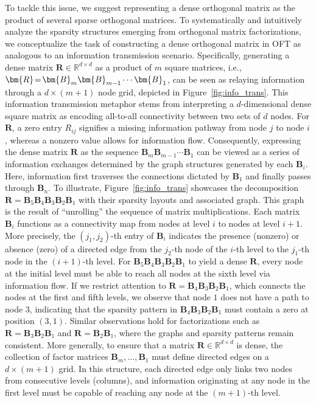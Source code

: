 To tackle this issue, we suggest representing a dense orthogonal matrix as the product of several sparse orthogonal matrices. To systematically and intuitively analyze the sparsity structures emerging from orthogonal matrix factorizations, we conceptualize the task of constructing a dense orthogonal matrix in OFT as analogous to an information transmission scenario. Specifically, generating a dense matrix $\bm{R}\in\mathbb{R}^{d\times d}$ as a product of $m$ square matrices, i.e., $\thickmuskip=2mu \medmuskip=2mu \bm{R}=\bm{B}_m\bm{B}_{m-1}\cdots\bm{B}_1$, can be seen as relaying information through a $d\times (m+1)$ node grid, depicted in Figure~\ref{fig:info_trans}. This information transmission metaphor stems from interpreting a $d$-dimensional dense square matrix as encoding all-to-all connectivity between two sets of $d$ nodes. For $\bm{R}$, a zero entry $R_{ij}$ signifies a missing information pathway from node $j$ to node $i$, whereas a nonzero value allows for information flow. Consequently, expressing the dense matrix $\bm{R}$ as the sequence $\bm{B}_m\bm{B}_{m-1}\cdots\bm{B}_1$ can be viewed as a series of information exchanges determined by the graph structures generated by each $\bm{B}_i$. Here, information first traverses the connections dictated by $\bm{B}_1$ and finally passes through $\bm{B}_n$. To illustrate, Figure~\ref{fig:info_trans} showcases the decomposition $\bm{R}=\bm{B}_5\bm{B}_4\bm{B}_3\bm{B}_2\bm{B}_1$ with their sparsity layouts and associated graph. This graph is the result of “unrolling” the sequence of matrix multiplications. Each matrix $\bm{B}_i$ functions as a connectivity map from nodes at level $i$ to nodes at level $i+1$. More precisely, the $(j_1, j_2)$-th entry of $\bm{B}_i$ indicates the presence (nonzero) or absence (zero) of a directed edge from the $j_2$-th node of the $i$-th level to the $j_1$-th node in the $(i+1)$-th level. For $\bm{B}_5\bm{B}_4\bm{B}_3\bm{B}_2\bm{B}_1$ to yield a dense $\bm{R}$, every node at the initial level must be able to reach all nodes at the sixth level via information flow. If we restrict attention to $\bm{R}=\bm{B}_4\bm{B}_3\bm{B}_2\bm{B}_1$, which connects the nodes at the first and fifth levels, we observe that node $1$ does not have a path to node $3$, indicating that the sparsity pattern in $\bm{B}_4\bm{B}_3\bm{B}_2\bm{B}_1$ must contain a zero at position $(3,1)$. Similar observations hold for factorizations such as $\bm{R}=\bm{B}_3\bm{B}_2\bm{B}_1$ and $\bm{R}=\bm{B}_2\bm{B}_1$, where the graphs and sparsity patterns remain consistent. More generally, to ensure that a matrix $\bm{R}\in\mathbb{R}^{d\times d}$ is dense, the collection of factor matrices $\bm{B}_m,\ldots,\bm{B}_1$ must define directed edges on a $d\times(m+1)$ grid. In this structure, each directed edge only links two nodes from consecutive levels (columns), and information originating at any node in the first level must be capable of reaching any node at the $(m+1)$-th level.

